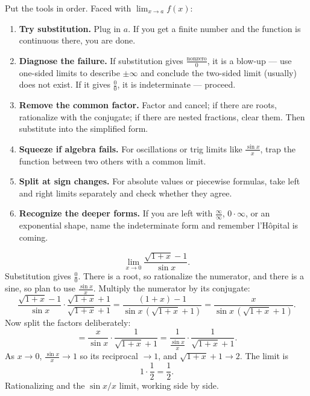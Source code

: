 Put the tools in order. Faced with $\displaystyle\lim_{x\to a} f(x)$:

\begin{enumerate}
  \item \textbf{Try substitution.} Plug in $a$. If you get a finite number and
  the function is continuous there, you are done.
  \item \textbf{Diagnose the failure.} If substitution gives
  $\frac{\text{nonzero}}{0}$, it is a blow-up --- use one-sided limits to
  describe $\pm\infty$ and conclude the two-sided limit (usually) does not
  exist. If it gives $\frac00$, it is indeterminate --- proceed.
  \item \textbf{Remove the common factor.} Factor and cancel; if there are
  roots, rationalize with the conjugate; if there are nested fractions, clear
  them. Then substitute into the simplified form.
  \item \textbf{Squeeze if algebra fails.} For oscillations or trig limits like
  $\frac{\sin x}{x}$, trap the function between two others with a common limit.
  \item \textbf{Split at sign changes.} For absolute values or piecewise
  formulas, take left and right limits separately and check whether they agree.
  \item \textbf{Recognize the deeper forms.} If you are left with
  $\frac\infty\infty$, $0\cdot\infty$, or an exponential shape, name the
  indeterminate form and remember l'H\^opital is coming.
\end{enumerate}

\begin{example}
\label{ch07:ex-combo}
\[
  \lim_{x\to 0}\frac{\sqrt{1+x}-1}{\sin x}.
\]
Substitution gives $\frac00$. There is a root, so rationalize the numerator,
and there is a sine, so plan to use $\frac{\sin x}{x}$. Multiply the numerator
by its conjugate:
\[
  \frac{\sqrt{1+x}-1}{\sin x}\cdot\frac{\sqrt{1+x}+1}{\sqrt{1+x}+1}
  = \frac{(1+x)-1}{\sin x\,(\sqrt{1+x}+1)}
  = \frac{x}{\sin x\,(\sqrt{1+x}+1)}.
\]
Now split the factors deliberately:
\[
  = \frac{x}{\sin x}\cdot\frac{1}{\sqrt{1+x}+1}
  = \frac{1}{\frac{\sin x}{x}}\cdot\frac{1}{\sqrt{1+x}+1}.
\]
As $x\to 0$, $\frac{\sin x}{x}\to 1$ so its reciprocal $\to 1$, and
$\sqrt{1+x}+1 \to 2$. The limit is
\[
  1\cdot\frac{1}{2} = \frac12.
\]
Rationalizing and the $\sin x/x$ limit, working side by side.
\end{example}

